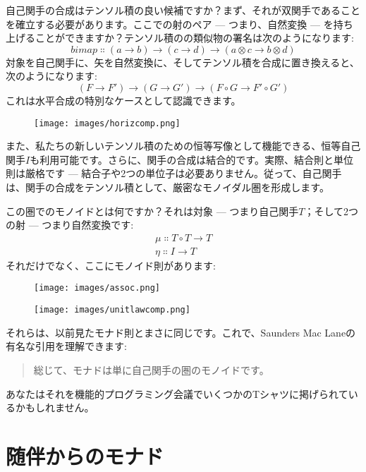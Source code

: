 自己関手の合成はテンソル積の良い候補ですか？まず、それが双関手であることを確立する必要があります。ここでの射のペア --- つまり、自然変換 --- を持ち上げることができますか？テンソル積のの類似物の署名は次のようになります: 
\[\mathit{bimap} \Colon (a \to b) \to (c \to d) \to (a \otimes c \to b \otimes d)\]
対象を自己関手に、矢を自然変換に、そしてテンソル積を合成に置き換えると、次のようになります: 
\[(F \to F') \to (G \to G') \to (F \circ G \to F' \circ G')\]
これは水平合成の特別なケースとして認識できます。

\begin{figure}[H]
  \centering
  \texttt{[image: images/horizcomp.png]}
\end{figure}

\noindent
また、私たちの新しいテンソル積のための恒等写像として機能できる、恒等自己関手$I$も利用可能です。さらに、関手の合成は結合的です。実際、結合則と単位則は厳格です --- 結合子や2つの単位子は必要ありません。従って、自己関手は、関手の合成をテンソル積として、厳密なモノイダル圏を形成します。

この圏でのモノイドとは何ですか？それは対象 --- つまり自己関手$T$；そして2つの射 --- つまり自然変換です: 
\begin{gather*}
  \mu \Colon T \circ T \to T \\
  \eta \Colon I \to T
\end{gather*}
それだけでなく、ここにモノイド則があります: 

\begin{figure}[H]
  \centering
  \texttt{[image: images/assoc.png]}
\end{figure}

\begin{figure}[H]
  \centering
  \texttt{[image: images/unitlawcomp.png]}
\end{figure}

\noindent
それらは、以前見たモナド則とまさに同じです。これで、Saunders Mac Laneの有名な引用を理解できます: 

\begin{quote}
  総じて、モナドは単に自己関手の圏のモノイドです。
\end{quote}
あなたはそれを機能的プログラミング会議でいくつかのTシャツに掲げられているかもしれません。

\section{随伴からのモナド}

